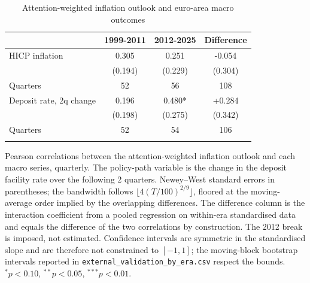 \begin{table}[htbp]
\centering
\caption{Attention-weighted inflation outlook and euro-area macro outcomes}
\label{tab:external-validation}
\begin{tabular}{lccc}
\toprule
 & 1999-2011 & 2012-2025 & Difference \\
\midrule
HICP inflation & 0.305 & 0.251 & -0.054 \\
& (0.194) & (0.229) & (0.304) \\
\quad Quarters & 52 & 56 & 108 \\
\addlinespace
Deposit rate, 2q change & 0.196 & 0.480* & +0.284 \\
& (0.198) & (0.275) & (0.342) \\
\quad Quarters & 52 & 54 & 106 \\
\addlinespace
\bottomrule
\end{tabular}
\begin{minipage}{0.86\textwidth}
\vspace{0.6em}
\footnotesize Pearson correlations between the attention-weighted inflation outlook and each macro series, quarterly. The policy-path variable is the change in the deposit facility rate over the following 2 quarters. Newey--West standard errors in parentheses; the bandwidth follows $\lfloor 4(T/100)^{2/9}\rfloor$, floored at the moving-average order implied by the overlapping differences. The difference column is the interaction coefficient from a pooled regression on within-era standardised data and equals the difference of the two correlations by construction. The 2012 break is imposed, not estimated. Confidence intervals are symmetric in the standardised slope and are therefore not constrained to $[-1,1]$; the moving-block bootstrap intervals reported in \texttt{external\_validation\_by\_era.csv} respect the bounds. $^{*}p<0.10$, $^{**}p<0.05$, $^{***}p<0.01$.
\end{minipage}
\end{table}

